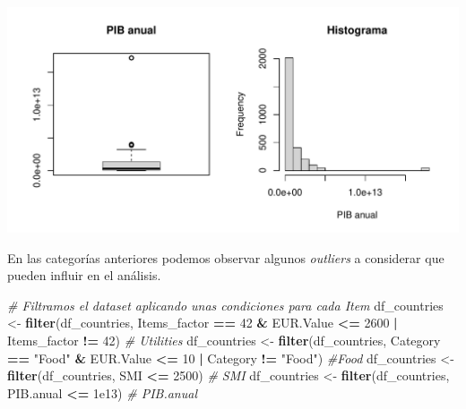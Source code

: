 \documentclass[
]{article}
\newenvironment{Shaded}{\begin{snugshade}}{\end{snugshade}}
\newcommand{\AttributeTok}[1]{\textcolor[rgb]{0.13,0.29,0.53}{#1}}
\newcommand{\CommentTok}[1]{\textcolor[rgb]{0.56,0.35,0.01}{\textit{#1}}}
\newcommand{\DecValTok}[1]{\textcolor[rgb]{0.00,0.00,0.81}{#1}}
\newcommand{\FloatTok}[1]{\textcolor[rgb]{0.00,0.00,0.81}{#1}}
\newcommand{\FunctionTok}[1]{\textcolor[rgb]{0.13,0.29,0.53}{\textbf{#1}}}
\newcommand{\NormalTok}[1]{#1}
\newcommand{\OtherTok}[1]{\textcolor[rgb]{0.56,0.35,0.01}{#1}}
\newcommand{\SpecialCharTok}[1]{\textcolor[rgb]{0.81,0.36,0.00}{\textbf{#1}}}
\newcommand{\StringTok}[1]{\textcolor[rgb]{0.31,0.60,0.02}{#1}}
\begin{document}
\begin{Shaded}
\end{Shaded}

\includegraphics{PRA2_Data_cleaning_and_analysis_files/figure-latex/unnamed-chunk-11-5.pdf}

En las categorías anteriores podemos observar algunos \emph{outliers} a
considerar que pueden influir en el análisis.

\begin{Shaded}
\begin{Highlighting}[]
\CommentTok{\# Filtramos el dataset aplicando unas condiciones para cada Item}
\NormalTok{df\_countries }\OtherTok{\textless{}{-}} \FunctionTok{filter}\NormalTok{(df\_countries, Items\_factor }\SpecialCharTok{==} \DecValTok{42} \SpecialCharTok{\&}\NormalTok{ EUR.Value }\SpecialCharTok{\textless{}=} \DecValTok{2600} \SpecialCharTok{|}\NormalTok{ Items\_factor }\SpecialCharTok{!=} \DecValTok{42}\NormalTok{) }\CommentTok{\# Utilities}
\NormalTok{df\_countries }\OtherTok{\textless{}{-}} \FunctionTok{filter}\NormalTok{(df\_countries, Category }\SpecialCharTok{==} \StringTok{"Food"} \SpecialCharTok{\&}\NormalTok{ EUR.Value }\SpecialCharTok{\textless{}=} \DecValTok{10} \SpecialCharTok{|}\NormalTok{ Category }\SpecialCharTok{!=} \StringTok{"Food"}\NormalTok{) }\CommentTok{\#Food}
\NormalTok{df\_countries }\OtherTok{\textless{}{-}} \FunctionTok{filter}\NormalTok{(df\_countries, SMI }\SpecialCharTok{\textless{}=} \DecValTok{2500}\NormalTok{) }\CommentTok{\# SMI}
\NormalTok{df\_countries }\OtherTok{\textless{}{-}} \FunctionTok{filter}\NormalTok{(df\_countries, PIB.anual }\SpecialCharTok{\textless{}=} \FloatTok{1e13}\NormalTok{) }\CommentTok{\# PIB.anual}
\end{Highlighting}
\end{Shaded}
\end{document}
